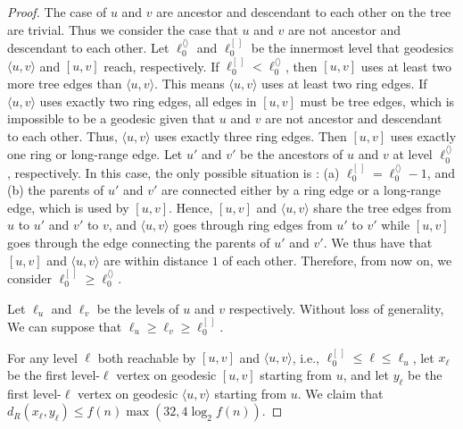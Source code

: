 \documentclass[11pt]{article}
\begin{document}
\begin{proof}
The case of $u$ and $v$ are ancestor and descendant to each other
	on the tree are trivial.
Thus we consider the case that $u$ and $v$ are not 
	ancestor and descendant to each other.
Let $\ell_0^{\langle\rangle}$ and  $\ell_0^{[\,]}$ be the innermost level that 
	geodesics $\langle u,v\rangle$ and $[u,v]$ reach, respectively.
If $\ell_0^{[\,]} < \ell_0^{\langle\rangle}$, then
	$[u,v]$ uses at least two more tree edges than $\langle u,v\rangle$.
This means $\langle u,v\rangle$ uses at least two ring edges.
If $\langle u,v\rangle$ uses exactly two ring edges, 
	all edges in $[u,v]$ must be tree edges, which is impossible
	to be a geodesic given that $u$ and $v$ are not 
	ancestor and descendant to each other.
Thus, $\langle u,v\rangle$ uses exactly three ring edges.
Then $[u,v]$ uses exactly one ring or long-range edge.
Let $u'$ and $v'$ be the ancestors of $u$ and $v$ at level 
	$\ell_0^{\langle\rangle}$, respectively.
In this case, the only possible situation is : 
	(a) $\ell_0^{[\,]} = \ell_0^{\langle\rangle}-1$, and
	(b) the parents of $u'$ and $v'$ are connected either by a ring edge
	or a long-range edge, which is used by $[u,v]$.
Hence, $[u,v]$ and $\langle u,v\rangle$ share the tree edges
	from $u$ to $u'$ and $v'$ to $v$, and $\langle u,v\rangle$
	goes through ring edges from $u'$ to $v'$ while 
	$[u,v]$ goes through the edge connecting the parents of $u'$ and $v'$.
We thus have that $[u,v]$ and $\langle u,v\rangle$ are within
	distance $1$ of each other.
Therefore, from now on, we consider $\ell_0^{[\,]} \ge \ell_0^{\langle\rangle}$.

Let $\ell_u$ and $\ell_v$ be
	the levels of $u$ and $v$ respectively. 
Without loss of generality, We can suppose that $\ell_u \geq \ell_v \geq 
	\ell_0^{[\,]}$.

For any level $\ell$ both reachable by $[u,v]$ and $\langle u,v\rangle$,
	i.e., $\ell_0^{[\,]} \le \ell \le \ell_u$, 
	let $x_\ell$ be the first level-$\ell$ vertex on 
	geodesic $[u,v]$ starting from $u$, and let $y_\ell$ be the first 
	level-$\ell$ vertex
	on geodesic $\langle u,v\rangle$ starting from $u$.
We claim that $d_R(x_\ell,y_\ell) \le f(n)\max(32,4\log_2 f(n))$.



\end{proof}
\end{document}
